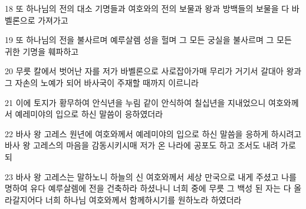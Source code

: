 \par 18 또 하나님의 전의 대소 기명들과 여호와의 전의 보물과 왕과 방백들의 보물을 다 바벨론으로 가져가고
\par 19 또 하나님의 전을 불사르며 예루살렘 성을 헐며 그 모든 궁실을 불사르며 그 모든 귀한 기명을 훼파하고
\par 20 무릇 칼에서 벗어난 자를 저가 바벨론으로 사로잡아가매 무리가 거기서 갈대아 왕과 그 자손의 노예가 되어 바사국이 주재할 때까지 이르니라
\par 21 이에 토지가 황무하여 안식년을 누림 같이 안식하여 칠십년을 지내었으니 여호와께서 예레미야의 입으로 하신 말씀이 응하였더라
\par 22 바사 왕 고레스 원년에 여호와께서 예레미야의 입으로 하신 말씀을 응하게 하시려고 바사 왕 고레스의 마음을 감동시키시매 저가 온 나라에 공포도 하고 조서도 내려 가로되
\par 23 바사 왕 고레스는 말하노니 하늘의 신 여호와께서 세상 만국으로 내게 주셨고 나를 명하여 유다 예루살렘에 전을 건축하라 하셨나니 너희 중에 무릇 그 백성 된 자는 다 올라갈지어다 너희 하나님 여호와께서 함께하시기를 원하노라 하였더라


